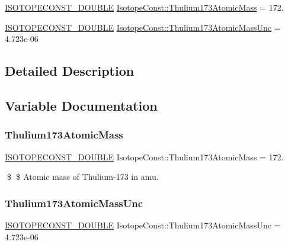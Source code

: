\begin{DoxyCompactItemize}
\item 
\mbox{\hyperlink{group___isotope_const-_macros_ga8f45a7272ce02c0b4c65c44636ed719a}{I\+S\+O\+T\+O\+P\+E\+C\+O\+N\+S\+T\+\_\+\+D\+O\+U\+B\+LE}} \mbox{\hyperlink{group___isotope_const-_thulium-_tm173_ga7115af97f290c93c5f2e9a3b8cdc9b5a}{Isotope\+Const\+::\+Thulium173\+Atomic\+Mass}} = 172.
\item 
\mbox{\hyperlink{group___isotope_const-_macros_ga8f45a7272ce02c0b4c65c44636ed719a}{I\+S\+O\+T\+O\+P\+E\+C\+O\+N\+S\+T\+\_\+\+D\+O\+U\+B\+LE}} \mbox{\hyperlink{group___isotope_const-_thulium-_tm173_ga93a5c28492b68e07762491a406dc0c33}{Isotope\+Const\+::\+Thulium173\+Atomic\+Mass\+Unc}} = 4.\+723e-\/06
\end{DoxyCompactItemize}


\subsection{Detailed Description}


\subsection{Variable Documentation}
\mbox{\label{group___isotope_const-_thulium-_tm173_ga7115af97f290c93c5f2e9a3b8cdc9b5a}} 
\subsubsection{\texorpdfstring{Thulium173\+Atomic\+Mass}{Thulium173AtomicMass}}
{\footnotesize\ttfamily \mbox{\hyperlink{group___isotope_const-_macros_ga8f45a7272ce02c0b4c65c44636ed719a}{I\+S\+O\+T\+O\+P\+E\+C\+O\+N\+S\+T\+\_\+\+D\+O\+U\+B\+LE}} Isotope\+Const\+::\+Thulium173\+Atomic\+Mass = 172.}

\$ \$ Atomic mass of Thulium-\/173 in amu. \mbox{\label{group___isotope_const-_thulium-_tm173_ga93a5c28492b68e07762491a406dc0c33}} 
\subsubsection{\texorpdfstring{Thulium173\+Atomic\+Mass\+Unc}{Thulium173AtomicMassUnc}}
{\footnotesize\ttfamily \mbox{\hyperlink{group___isotope_const-_macros_ga8f45a7272ce02c0b4c65c44636ed719a}{I\+S\+O\+T\+O\+P\+E\+C\+O\+N\+S\+T\+\_\+\+D\+O\+U\+B\+LE}} Isotope\+Const\+::\+Thulium173\+Atomic\+Mass\+Unc = 4.\+723e-\/06}

